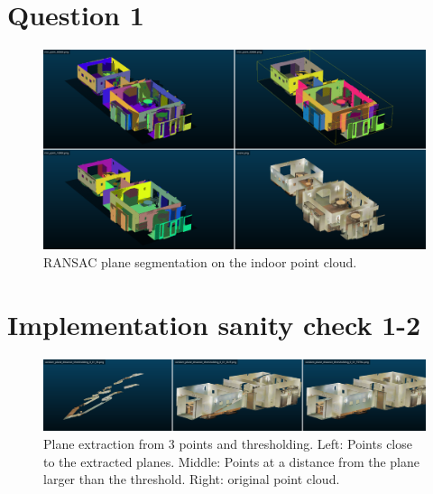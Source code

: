 \documentclass[a4paper]{article}
\begin{document}





\section*{Question 1}
\begin{figure}[ht]
  \centering
  \includegraphics[width=0.9\linewidth]{figures/ransac_cloud_compare_comparison.png}
  \caption{RANSAC plane segmentation on the indoor point cloud.}
  \label{fig:ransac_overview}
\end{figure}



\section*{Implementation sanity check 1-2}
\begin{figure}[ht]
  \centering
  \includegraphics[width=0.9\linewidth]{figures/random_plane_distance_thresholding_0_01.png}
  \caption{Plane extraction from 3 points and thresholding. Left: Points close to the extracted planes. Middle: Points at a distance from the plane larger than the threshold. Right: original point cloud. }
  \label{fig:sanity_check_planes}
\end{figure}
\end{document}
